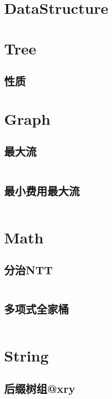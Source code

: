 \documentclass[titlepage, a4paper]{article}
\begin{document}
	\begin{titlepage}
		
	\end{titlepage}
	\begin{multicols}{2}
		\setcounter{tocdepth}{3}
		\begingroup
		\let\cleardoublepage\relax
		\let\clearpage\relax
		\begin{spacing}{0.8}
		\tableofcontents
		\end{spacing}
		\newpage
		
		\begin{spacing}{0.6}
			
\section{DataStructure}
\section{Tree}
\subsection{性质}

\section{Graph}
\subsection{最大流}
\inputminted{cpp}{tmp/Graph/最大流.cpp}
\subsection{最小费用最大流}
\inputminted{cpp}{tmp/Graph/最小费用最大流.cpp}
\section{Math}
\subsection{分治NTT}
\inputminted{cpp}{tmp/Math/分治NTT.cpp}
\subsection{多项式全家桶}
\inputminted{cpp}{tmp/Math/多项式全家桶.cpp}
\section{String}
\subsection{后缀树组@xry}
\inputminted{cpp}{tmp/String/后缀树组@xry.cpp}

\end{spacing}
\end{multicols}
\end{document}
